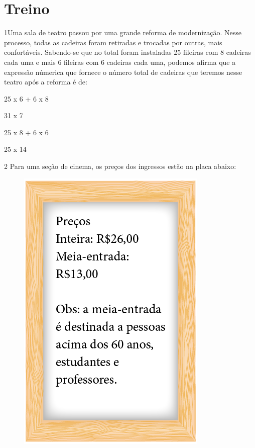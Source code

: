 
\pagebreak
\section*{Treino}

\num{1}Uma sala de teatro passou por uma grande reforma de modernização.
Nesse processo, todas as cadeiras foram retiradas e trocadas por outras,
mais confortáveis. Sabendo-se que no total foram instaladas 25 fileiras
com 8 cadeiras cada uma e mais 6 fileiras com 6 cadeiras cada uma,
podemos afirma que a expressão númerica que fornece o número total de
cadeiras que teremos nesse teatro após a reforma é de:

\begin{minipage}{.5\textwidth}
\begin{escolha}
\item
  25 x 6 + 6 x 8
\item
  31 x 7
\item
  25 x 8 + 6 x 6
\item
  25 x 14
\end{escolha}
\end{minipage}




\num{2} Para uma seção de cinema, os preços dos ingressos estão na placa
abaixo:

\begin{figure}[htpb!]
\centering
\includegraphics[width=.4\textwidth]{../ilustracoes/MAT5/SAEB_5ANO_MAT_figura93.png}
\end{figure}

